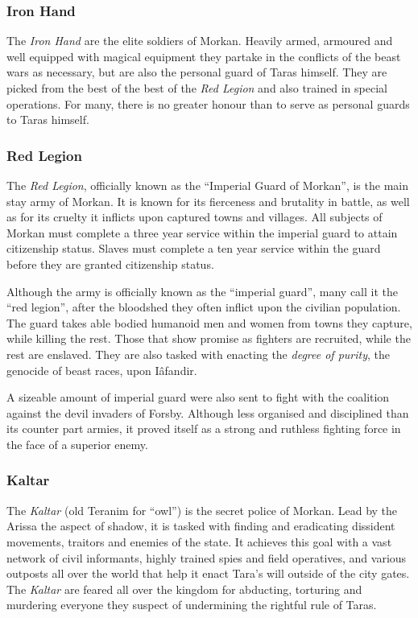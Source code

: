 \subsubsection*{Iron Hand}

The \emph{Iron Hand} are the elite soldiers of Morkan. Heavily armed, armoured
and well equipped with magical equipment they partake in the conflicts of the
beast wars as necessary, but are also the personal guard of Taras himself. They
are picked from the best of the best of the \emph{Red Legion} and also trained
in special operations. For many, there is no greater honour than to serve as
personal guards to Taras himself.

\subsubsection*{Red Legion}

The \emph{Red Legion}, officially known as the ``Imperial Guard of Morkan'',
is the main stay army of Morkan. It is known for its fierceness and brutality
in battle, as well as for its cruelty it inflicts upon captured towns and
villages.  All subjects of Morkan must complete a three year service within
the imperial guard to attain citizenship status. Slaves must complete a ten
year service within the guard before they are granted citizenship status.

Although the army is officially known as the ``imperial guard'', many call it
the ``red legion'', after the bloodshed they often inflict upon the civilian
population. The guard takes able bodied humanoid men and women from towns they
capture, while killing the rest. Those that show promise as fighters are
recruited, while the rest are enslaved. They are also tasked with enacting the
\emph{degree of purity}, the genocide of beast races, upon Iâfandir.

A sizeable amount of imperial guard were also sent to fight with the coalition
against the devil invaders of Forsby. Although less organised and disciplined
than its counter part armies, it proved itself as a strong and ruthless
fighting force in the face of a superior enemy.

\subsubsection*{Kaltar}

The \emph{Kaltar} (old Teranim for ``owl'') is the secret police of
Morkan. Lead by the Arissa the aspect of shadow, it is tasked with finding and
eradicating dissident movements, traitors and enemies of the state.  It
achieves this goal with a vast network of civil informants, highly trained
spies and field operatives, and various outposts all over the world that help
it enact Tara's will outside of the city gates. The \emph{Kaltar} are feared
all over the kingdom for abducting, torturing and murdering everyone they
suspect of undermining the rightful rule of Taras.
